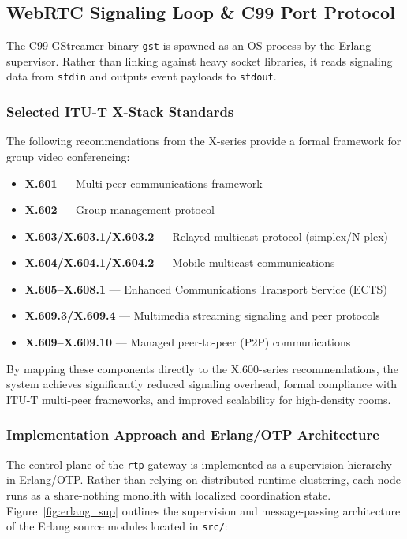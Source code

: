 \documentclass{article}
\begin{document}
\subsection{WebRTC Signaling Loop \& C99 Port Protocol}

The C99 GStreamer binary \texttt{gst} is spawned as an OS process by the Erlang supervisor.
Rather than linking against heavy socket libraries, it reads signaling data from \texttt{stdin} and
outputs event payloads to \texttt{stdout}.

\subsubsection{Selected ITU-T X-Stack Standards}
The following recommendations from the X-series provide a formal framework for group video conferencing:
\begin{itemize}
    \item \textbf{X.601} — Multi-peer communications framework
    \item \textbf{X.602} — Group management protocol
    \item \textbf{X.603/X.603.1/X.603.2} — Relayed multicast protocol (simplex/N-plex)
    \item \textbf{X.604/X.604.1/X.604.2} — Mobile multicast communications
    \item \textbf{X.605--X.608.1} — Enhanced Communications Transport Service (ECTS)
    \item \textbf{X.609.3/X.609.4} — Multimedia streaming signaling and peer protocols
    \item \textbf{X.609--X.609.10} — Managed peer-to-peer (P2P) communications
\end{itemize}

By mapping these components directly to the X.600-series recommendations,
the system achieves significantly reduced signaling overhead,
formal compliance with ITU-T multi-peer frameworks, and improved scalability for high-density rooms.

\newpage
\subsubsection{Implementation Approach and Erlang/OTP Architecture}
\label{sec:erlang-architecture}

The control plane of the \texttt{rtp} gateway is implemented as a supervision hierarchy in Erlang/OTP.
Rather than relying on distributed runtime clustering, each node runs as a share-nothing monolith with
localized coordination state. Figure~\ref{fig:erlang_sup} outlines the supervision and message-passing
architecture of the Erlang source modules located in \texttt{src/}:
\end{document}
